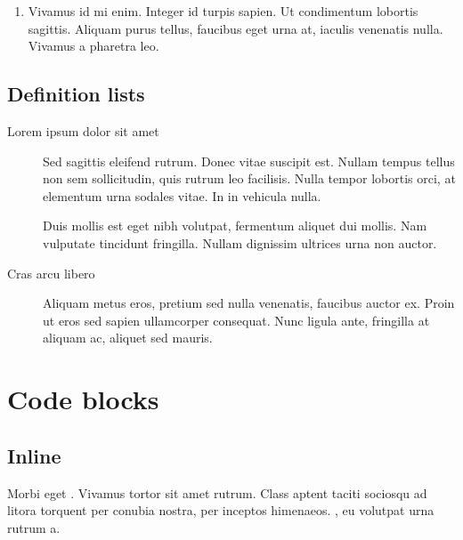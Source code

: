 \documentclass[letterpaper,10pt,english]{sphinxmanual}
\begin{document}
\begin{enumerate}
\item {} 
Vivamus id mi enim. Integer id turpis sapien. Ut condimentum lobortis
sagittis. Aliquam purus tellus, faucibus eget urna at, iaculis venenatis
nulla. Vivamus a pharetra leo.

\end{enumerate}


\subsection{Definition lists}
\label{\detokenize{markdown:definition-lists}}
\begin{description}
\item[{Lorem ipsum dolor sit amet}] \leavevmode
Sed sagittis eleifend rutrum. Donec vitae suscipit est. Nullam tempus
tellus non sem sollicitudin, quis rutrum leo facilisis. Nulla tempor
lobortis orci, at elementum urna sodales vitae. In in vehicula nulla.

Duis mollis est eget nibh volutpat, fermentum aliquet dui mollis. Nam
vulputate tincidunt fringilla. Nullam dignissim ultrices urna non
auctor.

\item[{Cras arcu libero}] \leavevmode
Aliquam metus eros, pretium sed nulla venenatis, faucibus auctor ex.
Proin ut eros sed sapien ullamcorper consequat. Nunc ligula ante,
fringilla at aliquam ac, aliquet sed mauris.

\end{description}


\section{Code blocks}
\label{\detokenize{markdown:code-blocks}}

\subsection{Inline}
\label{\detokenize{markdown:inline}}
Morbi eget . Vivamus  tortor sit amet
rutrum. Class aptent taciti sociosqu ad litora torquent per conubia nostra,
per inceptos himenaeos. {\hyperref[\detokenize{markdown:}]{\emph{}}}, eu volutpat urna
rutrum a.
\end{document}
